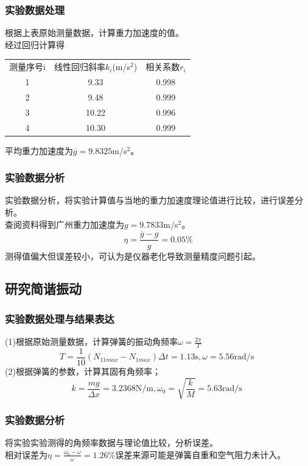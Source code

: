 \documentclass[dvipsnames, svgnames,a4paper,11pt]{article}
\begin{document}
\subsubsection*{实验数据处理}
\noindent 根据上表原始测量数据，计算重力加速度的值。\\
经过回归计算得
\begin{table}[H]
	\centering
	\begin{tabularx}{0.8\textwidth}{|c|c|c|}
		\cline{1-3}
		测量序号i&线性回归斜率$k_i$(m/s$^2$)&相关系数$r_i$\\
		\cline{1-3}
		1&9.33&0.998\\
		\cline{1-3}
		2&9.48&0.999\\
		\cline{1-3}
		3&10.22&0.996\\
		\cline{1-3}
		4&10.30&0.999\\
		\cline{1-3}
	\end{tabularx}
\end{table}
平均重力加速度为$\overline{g}=9.8325$m/s$^2$。
\subsubsection*{实验数据分析}
\noindent 实验数据分析，将实验计算值与当地的重力加速度理论值进行比较，进行误差分析。\\
查阅资料得到广州重力加速度为$g=9.7833$m/s$^2$。
$$\eta=\frac{\overline{g}-g}{g}=0.05\%$$
测得值偏大但误差较小，可认为是仪器老化导致测量精度问题引起。

\subsection{研究简谐振动}
\subsubsection*{实验数据处理与结果表达}
\noindent (1)根据原始测量数据，计算弹簧的振动角频率$\omega=\frac{2\pi}{T}$\\
$$T=\frac{1}{10}(N_{11max}-N_{1max})\Delta t=1.13\text{s},\omega=5.56\text{rad/s }$$
(2)根据弹簧的参数，计算其固有角频率；\\
$$k=\frac{mg}{\Delta x}=3.2368\text{N/m},\omega_0=\sqrt{\frac{k}{M}}=5.63\text{rad/s }$$
\subsubsection*{实验数据分析}
\noindent 将实验实验测得的角频率数据与理论值比较，分析误差。\\
相对误差为$\eta=\frac{\omega_0-\omega}{\omega}=1.26\%$误差来源可能是弹簧自重和空气阻力未计入。
\end{document}
